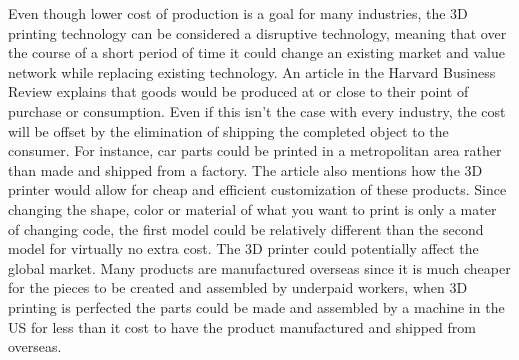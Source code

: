 \documentclass[12pt,twocolumn]{article}
\begin{document}
\indent Even though lower cost of production is a goal for many industries, the 3D printing technology can be considered a disruptive technology, meaning that over the course of a short period of time it could change an existing market and value network while replacing existing technology. An article in the Harvard Business Review explains that goods would be produced at or close to their point of purchase or consumption. Even if this isn't the case with every industry, the cost will be offset by the elimination of shipping the completed object to the consumer. For instance, car parts could be printed in a metropolitan area rather than made and shipped from a factory. The article also mentions how the 3D printer would allow for cheap and efficient customization of these products. Since changing the shape, color or material of what you want to print is only a mater of changing code, the first model could be relatively different than the second model for virtually no extra cost. \cite{cite6} The 3D printer could potentially affect the global market. Many products are manufactured overseas since it is much cheaper for the pieces to be created and assembled by underpaid workers, when 3D printing is perfected the parts could be made and assembled by a machine in the US for less than it cost to have the product manufactured and shipped from overseas. 
\end{document}

